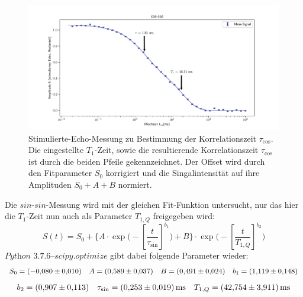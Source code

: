 \begin{figure}[H]
    \centering
    \includegraphics[width=\textwidth]{Auswertung/Para_der_Korrfkt/cos_cos.pdf}
    \caption{Stimulierte-Echo-Messung zu Bestimmung der Korrelationszeit
    $\tau_{\text{cos}}$. Die eingestellte $T_1$-Zeit, sowie die resultierende
    Korrelationszeit $\tau_{\text{cos}}$ ist durch die beiden Pfeile gekennzeichnet.
    Der Offset wird durch den Fitparameter $S_0$ korrigiert und die
    Singalintensität auf ihre Amplituden $S_0+A+B$ normiert.}
    \label{fig:cos-cos}
\end{figure}
\noindent
Die $sin$-$sin$-Messung wird mit der gleichen Fit-Funktion untersucht, nur das hier die $T_1$-Zeit nun auch als Parameter $T_{1,Q}$ freigegeben wird:
\begin{equation*}
  S(t) = S_0 + \biggl\{
  A \cdot \exp\biggl(-\left[\frac{t}{\tau_{\text{sin}}} \right]^{b_1}
  \biggr) + B
  \biggr\} \cdot
  \exp\biggl(-\left[\frac{t}{T_{1,Q}} \right]^{b_2}
  \biggr)
\end{equation*}
\noindent
$\textit{Python 3.7.6--scipy.optimize}$ gibt dabei folgende Parameter wieder:
\begin{equation*}
  S_0 = \SI{-0.080\pm0.010}{}
  \quad
  A   = \SI{0.589\pm0.037}{}
  \quad
  B   = \SI{0.491\pm0.024}{}
  \quad
  b_1 = \SI{1,119\pm0.148}{}
\end{equation*}
\begin{equation*}
  b_2 = \SI{0,907\pm0,113}{}
  \quad
  \tau_{\text{sin}} = \SI{0,253\pm0,019}{\milli\second}
  \quad
  T_{1,Q} = \SI{42,754\pm3,911}{\milli\second}
\end{equation*}

